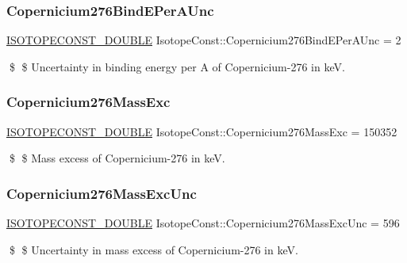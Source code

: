 \subsubsection{\texorpdfstring{Copernicium276\+Bind\+E\+Per\+A\+Unc}{Copernicium276BindEPerAUnc}}
{\footnotesize\ttfamily \mbox{\hyperlink{group___isotope_const-_macros_ga8f45a7272ce02c0b4c65c44636ed719a}{I\+S\+O\+T\+O\+P\+E\+C\+O\+N\+S\+T\+\_\+\+D\+O\+U\+B\+LE}} Isotope\+Const\+::\+Copernicium276\+Bind\+E\+Per\+A\+Unc = 2}

\$ \$ Uncertainty in binding energy per A of Copernicium-\/276 in keV. \mbox{\label{group___isotope_const-_copernicium-_cn276_ga31f6eb869c8275b4da7ef0e4de7be1af}} 
\subsubsection{\texorpdfstring{Copernicium276\+Mass\+Exc}{Copernicium276MassExc}}
{\footnotesize\ttfamily \mbox{\hyperlink{group___isotope_const-_macros_ga8f45a7272ce02c0b4c65c44636ed719a}{I\+S\+O\+T\+O\+P\+E\+C\+O\+N\+S\+T\+\_\+\+D\+O\+U\+B\+LE}} Isotope\+Const\+::\+Copernicium276\+Mass\+Exc = 150352}

\$ \$ Mass excess of Copernicium-\/276 in keV. \mbox{\label{group___isotope_const-_copernicium-_cn276_ga9d7d34b99f02303e60caa0454bf342fb}} 
\subsubsection{\texorpdfstring{Copernicium276\+Mass\+Exc\+Unc}{Copernicium276MassExcUnc}}
{\footnotesize\ttfamily \mbox{\hyperlink{group___isotope_const-_macros_ga8f45a7272ce02c0b4c65c44636ed719a}{I\+S\+O\+T\+O\+P\+E\+C\+O\+N\+S\+T\+\_\+\+D\+O\+U\+B\+LE}} Isotope\+Const\+::\+Copernicium276\+Mass\+Exc\+Unc = 596}

\$ \$ Uncertainty in mass excess of Copernicium-\/276 in keV. \mbox{\label{group___isotope_const-_copernicium-_cn276_gab1c7b92f45347f6c6fd1dd6494112830}} 
